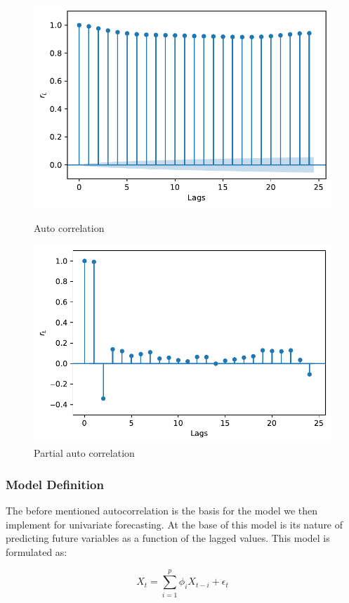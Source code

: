 \documentclass
[twocolumn,
secnumarabic,
nobibnotes,
aps,
prl,
reprint,
groupedaddress,
amsmath,
amssymb,
]{revtex4-2}
\begin{document}
\begin{figure}
  \includegraphics[width=\columnwidth]{figures/AR_acf.pdf}
  \caption{\label{fig:AR_acf} Auto correlation}
  \includegraphics[width=\columnwidth]{figures/AR_pacf.pdf}
  \caption{\label{fig:AR_pacf} Partial auto correlation}
\end{figure}


\subsubsection{Model Definition}

The before mentioned autocorrelation is the basis for the model we then implement for univariate forecasting. At the base of this model is its nature of predicting future variables as a function of the lagged values. This model is formulated as:

\[
X_t = \sum_{i=1}^{p} \phi_i X_{t-i} + \epsilon_{t}
\]
\end{document}
